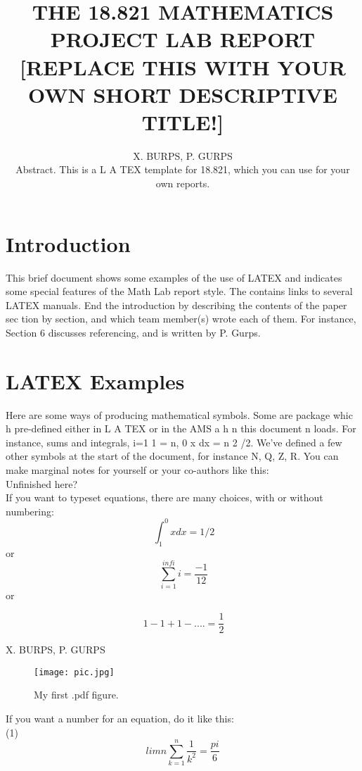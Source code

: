\documentclass{article}
\title{THE 18.821 MATHEMATICS PROJECT LAB REPORT
	[REPLACE THIS WITH YOUR OWN SHORT
	DESCRIPTIVE TITLE!]}
\author{X. BURPS, P. GURPS\\
Abstract. This is a L A TEX template for 18.821, which you can
use for your own reports.}
\begin{document}
	\maketitle
    \centering
\section{Introduction}
This brief document shows some examples of the use of LATEX and
indicates some special features of the Math Lab report style. The
\cite {course website}
contains links to several LATEX manuals.
End the introduction by describing the contents of the paper sec­
tion by section, and which team member(s) wrote each of them. For
instance, Section 6 discusses referencing, and is written by P. Gurps.\\
\section{ LATEX Examples}
Here are some ways of producing mathematical symbols. Some are
package whic h
pre-deﬁned either in L A TEX or in the AMS a
h n this document
n
loads. For instance, sums and integrals, i=1 1 = n, 0 x dx = n 2 /2.
We’ve deﬁned a few other symbols at the start of the document, for
instance N, Q, Z, R. You can make marginal notes for yourself or your
co-authors like this:\\
 Unﬁnished here?\\
 If you want to typeset equations, there are many choices, with or
without numbering:\\

	
\[\
\int^0_1{x}{dx}={1}/{2}
\]
or
\[\
\sum_{i=1}^{infi} i=\frac{-1}{12}
\] or

\[\
1 - 1 + 1-.... =\frac{1}{2}
\]

\newpage
 X. BURPS, P. GURPS\\ 
 \begin{figure}[htbt]
	\centering
	
	\texttt{[image: pic.jpg]}
	\label{example} \\
\caption{ My ﬁrst .pdf ﬁgure.}
\end{figure}



If you want a number for an equation, do it like this:\\


(1)\newline 
\[
lim n\sum_{k=1}^{n}\frac{1}{k^2}= \frac {pi}{6}
\]
\end{document}
